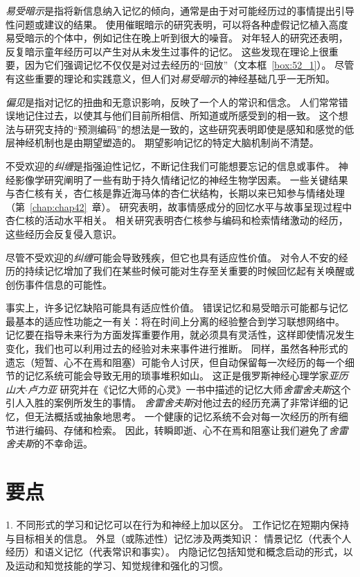 \textit{易受暗示}是指将新信息纳入记忆的倾向，通常是由于对可能经历过的事情提出引导性问题或建议的结果。
使用催眠暗示的研究表明，可以将各种虚假记忆植入高度易受暗示的个体中，例如记住在晚上听到很大的噪音。
对年轻人的研究还表明，反复暗示童年经历可以产生对从未发生过事件的记忆。
这些发现在理论上很重要，因为它们强调记忆不仅仅是对过去经历的“回放”（文本框~\ref{box:52_1}）。
尽管有这些重要的理论和实践意义，但人们对\textit{易受暗示}的神经基础几乎一无所知。


\textit{偏见}是指对记忆的扭曲和无意识影响，反映了一个人的常识和信念。
人们常常错误地记住过去，以使其与他们目前所相信、所知道或所感受到的相一致。
这个想法与研究支持的“预测编码”的想法是一致的，这些研究表明即使是感知和感觉的低层神经机制也是由期望塑造的。
期望影响记忆的特定大脑机制尚不清楚。


不受欢迎的\textit{纠缠}是指强迫性记忆，不断记住我们可能想要忘记的信息或事件。
神经影像学研究阐明了一些有助于持久情绪记忆的神经生物学因素。
一些关键结果与杏仁核有关，杏仁核是靠近海马体的杏仁状结构，长期以来已知参与情绪处理（第~\ref{chap:chap42}~章）。
研究表明，故事情感成分的回忆水平与故事呈现过程中杏仁核的活动水平相关。
相关研究表明杏仁核参与编码和检索情绪激动的经历，这些经历会反复侵入意识。


尽管不受欢迎的\textit{纠缠}可能会导致残疾，但它也具有适应性价值。
对令人不安的经历的持续记忆增加了我们在某些时候可能对生存至关重要的时候回忆起有关唤醒或创伤事件信息的可能性。


事实上，许多记忆缺陷可能具有适应性价值。
错误记忆和易受暗示可能都与记忆最基本的适应性功能之一有关：将在时间上分离的经验整合到学习联想网络中。
记忆要在指导未来行为方面发挥重要作用，就必须具有灵活性，这样即使情况发生变化，我们也可以利用过去的经验对未来事件进行推断。
同样，虽然各种形式的遗忘（短暂、心不在焉和阻塞）可能令人讨厌，但自动保留每一次经历的每一个细节的记忆系统可能会导致无用的琐事堆积如山。
这正是俄罗斯神经心理学家\textit{亚历山大$\cdot$卢力亚} 研究并在《记忆大师的心灵》一书中描述的记忆大师\textit{舍雷舍夫斯}这个引人入胜的案例所发生的事情。
\textit{舍雷舍夫斯}对他过去的经历充满了非常详细的记忆，但无法概括或抽象地思考。
一个健康的记忆系统不会对每一次经历的所有细节进行编码、存储和检索。
因此，转瞬即逝、心不在焉和阻塞让我们避免了\textit{舍雷舍夫斯}的不幸命运。



\section{要点}

1. 不同形式的学习和记忆可以在行为和神经上加以区分。
工作记忆在短期内保持与目标相关的信息。
外显（或陈述性）记忆涉及两类知识：
情景记忆（代表个人经历）和语义记忆（代表常识和事实）。
内隐记忆包括知觉和概念启动的形式，以及运动和知觉技能的学习、知觉规律和强化的习惯。 


